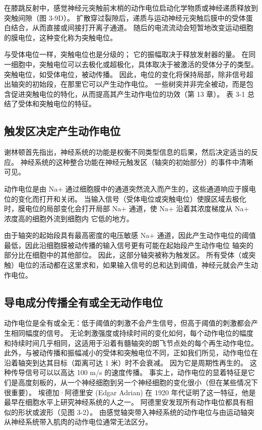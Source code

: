 在膝跳反射中，感觉神经元突触前末梢的动作电位启动化学物质或神经递质释放到突触间隙（图 3-9D）。 扩散穿过裂隙后，递质与运动神经元突触后膜中的受体蛋白结合，从而直接或间接打开离子通道。 随后的电流流动会短暂地改变运动细胞的膜电位，这种变化称为突触电位。

与受体电位一样，突触电位也是分级的； 它的振幅取决于释放发射器的量。 在同一细胞中，突触电位可以去极化或超极化，具体取决于被激活的受体分子的类型。 突触电位，如受体电位，被动传播。 因此，电位的变化将保持局部，除非信号超出轴突的初始段，在那里它可以产生动作电位。 一些树突并非完全被动，而是包含促进突触电位的特化，从而提高其产生动作电位的功效（第 13 章）。 表 3-1 总结了受体和突触电位的特征。

\subsection{触发区决定产生动作电位}
谢林顿首先指出，神经系统的功能是权衡不同类型信息的后果，然后决定适当的反应。 神经系统的这种整合功能在神经元触发区（轴突的初始部分）的事件中清晰可见。

动作电位是由 Na+ 通过细胞膜中的通道突然流入而产生的，这些通道响应于膜电位的变化而打开和关闭。 当输入信号（受体电位或突触电位）使膜区域去极化时，膜电位的局部变化会打开局部 Na+ 通道，使 Na+ 沿着其浓度梯度从 Na+ 浓度高的细胞外流到细胞内 它低的地方。

由于轴突的起始段具有最高密度的电压敏感 Na+ 通道，因此产生动作电位的阈值最低，因此沿细胞膜被动传播的输入信号更有可能在起始段产生动作电位 轴突的部分比在细胞中的其他部位。 因此，这部分轴突被称为触发区。 所有受体（或突触）电位的活动都在这里求和，如果输入信号的总和达到阈值，神经元就会产生动作电位。

\subsection{导电成分传播全有或全无动作电位}
动作电位是全有或全无：低于阈值的刺激不会产生信号，但高于阈值的刺激都会产生相同幅度的信号。 无论刺激强度或持续时间的变化如何，每个动作电位的幅度和持续时间几乎相同，这适用于沿着有髓轴突的朗飞节点处的每个再生动作电位。 此外，与被动传播和振幅减小的受体和突触电位不同，正如我们所见，动作电位在沿着轴突到达其目标（距离可达 1 米）时不会衰减。 因为它是周期性再生的。 这种传导信号可以以高达 100 m/s 的速度传播。 事实上，动作电位的显着特征是它们是高度刻板的，从一个神经细胞到另一个神经细胞的变化很小（但在某些情况下很重要）。 埃德加·阿德里安 (Edgar Adrian) 在 1920 年代证明了这一特征，他是最早在细胞水平上研究神经系统的人之一。 阿德里安发现所有动作电位都具有相似的形状或波形（见图 3-2）。 由感觉轴突带入神经系统的动作电位与由运动轴突从神经系统带入肌肉的动作电位通常无法区分。

